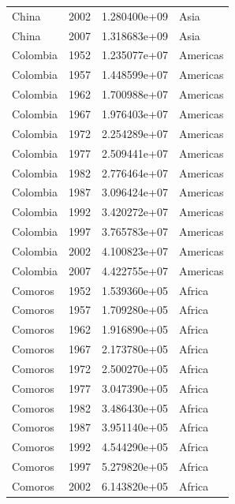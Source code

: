 \documentclass[
  letterpaper,
  DIV=11,
  numbers=noendperiod]{scrreprt}
\begin{document}
\begin{tcolorbox}
\begin{tabular}{lrrl}
China                    &  2002 &  1.280400e+09 &      Asia \\
China                    &  2007 &  1.318683e+09 &      Asia \\
Colombia                 &  1952 &  1.235077e+07 &  Americas \\
Colombia                 &  1957 &  1.448599e+07 &  Americas \\
Colombia                 &  1962 &  1.700988e+07 &  Americas \\
Colombia                 &  1967 &  1.976403e+07 &  Americas \\
Colombia                 &  1972 &  2.254289e+07 &  Americas \\
Colombia                 &  1977 &  2.509441e+07 &  Americas \\
Colombia                 &  1982 &  2.776464e+07 &  Americas \\
Colombia                 &  1987 &  3.096424e+07 &  Americas \\
Colombia                 &  1992 &  3.420272e+07 &  Americas \\
Colombia                 &  1997 &  3.765783e+07 &  Americas \\
Colombia                 &  2002 &  4.100823e+07 &  Americas \\
Colombia                 &  2007 &  4.422755e+07 &  Americas \\
Comoros                  &  1952 &  1.539360e+05 &    Africa \\
Comoros                  &  1957 &  1.709280e+05 &    Africa \\
Comoros                  &  1962 &  1.916890e+05 &    Africa \\
Comoros                  &  1967 &  2.173780e+05 &    Africa \\
Comoros                  &  1972 &  2.500270e+05 &    Africa \\
Comoros                  &  1977 &  3.047390e+05 &    Africa \\
Comoros                  &  1982 &  3.486430e+05 &    Africa \\
Comoros                  &  1987 &  3.951140e+05 &    Africa \\
Comoros                  &  1992 &  4.544290e+05 &    Africa \\
Comoros                  &  1997 &  5.279820e+05 &    Africa \\
Comoros                  &  2002 &  6.143820e+05 &    Africa \\

\end{tabular}
\end{tcolorbox}
\end{document}
